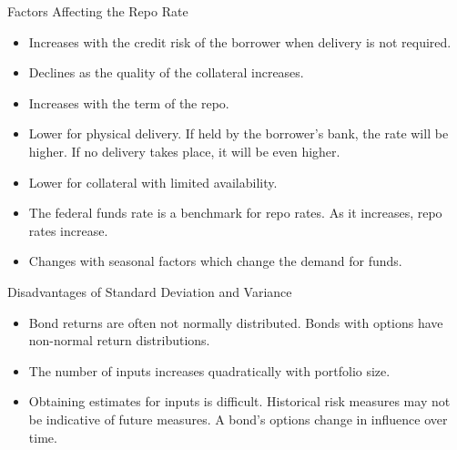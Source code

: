 \documentclass[../custom]{flashcards}
\begin{document}
\begin{flashcard}{Factors Affecting the Repo Rate}
    \begin{itemize}
        \item Increases with the credit risk of the borrower when delivery is not required.
        \item Declines as the quality of the collateral increases.
        \item Increases with the term of the repo.
        \item Lower for physical delivery. If held by the borrower's bank, the rate will be higher. If no delivery takes place, it will be even higher.
        \item Lower for collateral with limited availability.
        \item The federal funds rate is a benchmark for repo rates. As it increases, repo rates increase.
        \item Changes with seasonal factors which change the demand for funds.
    \end{itemize}
\end{flashcard}

\begin{flashcard}{Disadvantages of Standard Deviation and Variance}
    \begin{itemize}
        \item Bond returns are often not normally distributed. Bonds with options have non-normal return distributions.
        \item The number of inputs increases quadratically with portfolio size.
        \item Obtaining estimates for inputs is difficult. Historical risk measures may not be indicative of future measures. A bond's options change in influence over time.
    \end{itemize}
\end{flashcard}
\end{document}
